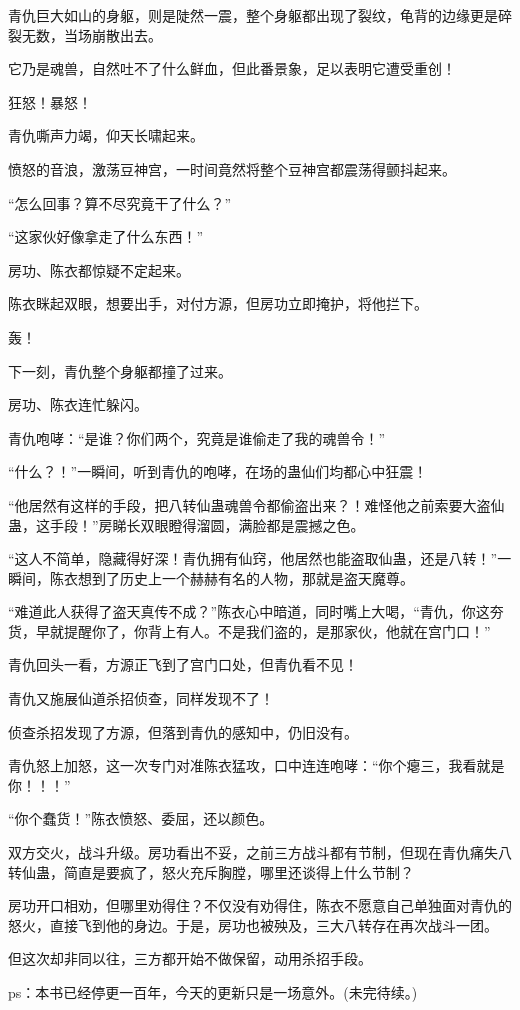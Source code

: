 \begin{this_body}
青仇巨大如山的身躯，则是陡然一震，整个身躯都出现了裂纹，龟背的边缘更是碎裂无数，当场崩散出去。

它乃是魂兽，自然吐不了什么鲜血，但此番景象，足以表明它遭受重创！

狂怒！暴怒！

青仇嘶声力竭，仰天长啸起来。

愤怒的音浪，激荡豆神宫，一时间竟然将整个豆神宫都震荡得颤抖起来。

“怎么回事？算不尽究竟干了什么？”

“这家伙好像拿走了什么东西！”

房功、陈衣都惊疑不定起来。

陈衣眯起双眼，想要出手，对付方源，但房功立即掩护，将他拦下。

轰！

下一刻，青仇整个身躯都撞了过来。

房功、陈衣连忙躲闪。

青仇咆哮：“是谁？你们两个，究竟是谁偷走了我的魂兽令！”

“什么？！”一瞬间，听到青仇的咆哮，在场的蛊仙们均都心中狂震！

“他居然有这样的手段，把八转仙蛊魂兽令都偷盗出来？！难怪他之前索要大盗仙蛊，这手段！”房睇长双眼瞪得溜圆，满脸都是震撼之色。

“这人不简单，隐藏得好深！青仇拥有仙窍，他居然也能盗取仙蛊，还是八转！”一瞬间，陈衣想到了历史上一个赫赫有名的人物，那就是盗天魔尊。

“难道此人获得了盗天真传不成？”陈衣心中暗道，同时嘴上大喝，“青仇，你这夯货，早就提醒你了，你背上有人。不是我们盗的，是那家伙，他就在宫门口！”

青仇回头一看，方源正飞到了宫门口处，但青仇看不见！

青仇又施展仙道杀招侦查，同样发现不了！

侦查杀招发现了方源，但落到青仇的感知中，仍旧没有。

青仇怒上加怒，这一次专门对准陈衣猛攻，口中连连咆哮：“你个瘪三，我看就是你！！！”

“你个蠢货！”陈衣愤怒、委屈，还以颜色。

双方交火，战斗升级。房功看出不妥，之前三方战斗都有节制，但现在青仇痛失八转仙蛊，简直是要疯了，怒火充斥胸膛，哪里还谈得上什么节制？

房功开口相劝，但哪里劝得住？不仅没有劝得住，陈衣不愿意自己单独面对青仇的怒火，直接飞到他的身边。于是，房功也被殃及，三大八转存在再次战斗一团。

但这次却非同以往，三方都开始不做保留，动用杀招手段。

ps：本书已经停更一百年，今天的更新只是一场意外。(未完待续。)

\end{this_body}

